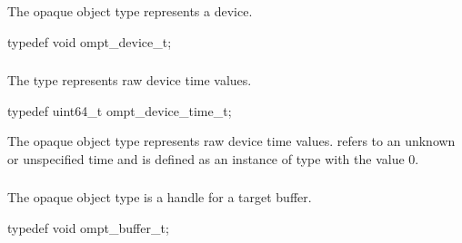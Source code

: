 \subsubsection{}
\label{sec:ompt_device_t}

\summary
The  opaque object type represents a device.

\format
\begin{ccppspecific}
\begin{omptOther}
typedef void ompt_device_t;
\end{omptOther}
\end{ccppspecific}



\subsubsection{}
\label{sec:ompt_device_time_t}

\summary
The  type represents raw device time values.

\format
\begin{ccppspecific}
\begin{omptOther}
typedef uint64_t ompt_device_time_t;
\end{omptOther}
\end{ccppspecific}

\descr
\label{sec:ompt_time_none}
The  opaque object type represents raw device time values.
 refers to an unknown or unspecified time and is defined as 
an instance of type  with the value 0.



\subsubsection{}
\label{sec:ompt_buffer_t}

\summary
The  opaque object type is a handle for a target buffer.

\format
\begin{ccppspecific}
\begin{omptOther}
typedef void ompt_buffer_t;
\end{omptOther}
\end{ccppspecific}



\subsubsection{}
\label{sec:ompt_buffer_cursor_t}

